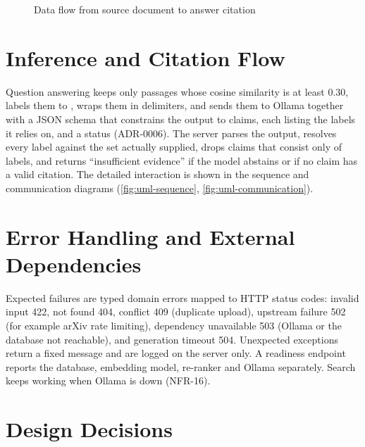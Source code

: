 \begin{figure}[htbp]
  \centering
  \caption{Data flow from source document to answer citation}\label{fig:dataflow}
\end{figure}

\section{Inference and Citation Flow}

Question answering keeps only passages whose cosine similarity is at least 0.30, labels them  to
, wraps them in delimiters, and sends them to Ollama together with a JSON schema that constrains the output
to claims, each listing the labels it relies on, and a status (ADR-0006). The server parses the output, resolves
every label against the set actually supplied, drops claims that consist only of labels, and returns
``insufficient evidence'' if the model abstains or if no claim has a valid citation. The detailed interaction is
shown in the sequence and communication diagrams (\autoref{fig:uml-sequence}, \autoref{fig:uml-communication}).

\section{Error Handling and External Dependencies}

Expected failures are typed domain errors mapped to HTTP status codes: invalid input 422, not found 404, conflict
409 (duplicate upload), upstream failure 502 (for example arXiv rate limiting), dependency unavailable 503 (Ollama
or the database not reachable), and generation timeout 504. Unexpected exceptions return a fixed
 message and are logged on the server only. A readiness endpoint reports the database,
embedding model, re-ranker and Ollama separately. Search keeps working when Ollama is down (NFR-16).

\section{Design Decisions}

